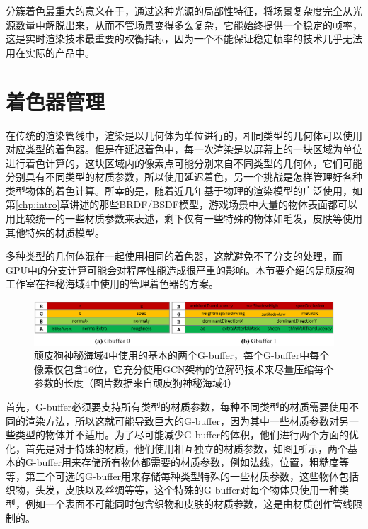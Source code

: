 分簇着色最重大的意义在于，通过这种光源的局部性特征，将场景复杂度完全从光源数量中解脱出来，从而不管场景变得多么复杂，它能始终提供一个稳定的帧率，这是实时渲染技术最重要的权衡指标，因为一个不能保证稳定帧率的技术几乎无法用在实际的产品中。





\section{着色器管理}\label{sec:shade-deferred-custom-shader}
在传统的渲染管线中，渲染是以几何体为单位进行的，相同类型的几何体可以使用对应类型的着色器。但是在延迟着色中，每一次渲染是以屏幕上的一块区域为单位进行着色计算的，这块区域内的像素点可能分别来自不同类型的几何体，它们可能分别具有不同类型的材质参数，所以使用延迟着色，另一个挑战是怎样管理好各种类型物体的着色计算。所幸的是，随着近几年基于物理的渲染模型的广泛使用，如第\ref{chp:intro}章讲述的那些BRDF/BSDF模型，游戏场景中大量的物体表面都可以用比较统一的一些材质参数来表述，剩下仅有一些特殊的物体如毛发，皮肤等使用其他特殊的材质模型。

多种类型的几何体混在一起使用相同的着色器，这就避免不了分支的处理，而GPU中的分支计算可能会对程序性能造成很严重的影响。本节要介绍的是顽皮狗工作室在神秘海域4\cite{a:DeferredLightinginUncharted4}中使用的管理着色器的方案。

\begin{figure}
\begin{fullwidth}
	\includegraphics[width=1.0\thewidth]{figures/shade/g-buffer}
	\caption{顽皮狗神秘海域4中使用的基本的两个G-buffer，每个G-buffer中每个像素仅包含16位，它充分使用GCN架构的位解码技术来尽量压缩每个参数的长度（图片数据来自顽皮狗神秘海域4）}
	\label{f:shade-g-buffer}
\end{fullwidth}
\end{figure}

首先，G-buffer必须要支持所有类型的材质参数，每种不同类型的材质需要使用不同的渲染方法，所以这就可能导致巨大的G-buffer，因为其中一些材质参数对另一些类型的物体并不适用。为了尽可能减少G-buffer的体积，他们进行两个方面的优化，首先是对于特殊的材质，他们使用相互独立的材质参数，如图\ref{f:shade-g-buffer}所示，两个基本的G-buffer用来存储所有物体都需要的材质参数，例如法线，位置，粗糙度等等，第三个可选的G-buffer用来存储每种类型特殊的一些材质参数，这些物体包括织物，头发，皮肤以及丝绸等等，这个特殊的G-buffer对每个物体只使用一种类型，例如一个表面不可能同时包含织物和皮肤的材质参数，这是由材质创作管线限制的。

